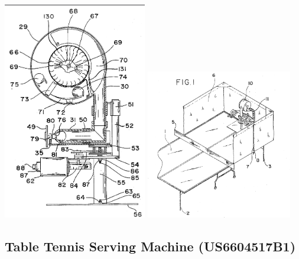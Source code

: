 \documentclass[12pt]{report}
\begin{document}
\begin{minipage}{0.38\textwidth}  %
    \centering
    \includegraphics[width=0.47\textwidth]{figures/patent1-2.png}  %
    \hfill
    \includegraphics[width=0.48\textwidth,height=0.68\textwidth]{figures/patent1-1.png}  %
    \label{fig:pt1-2}
\end{minipage}


\subsection{Table Tennis Serving Machine (US6604517B1) \cite{Chao2003}}
\end{document}
